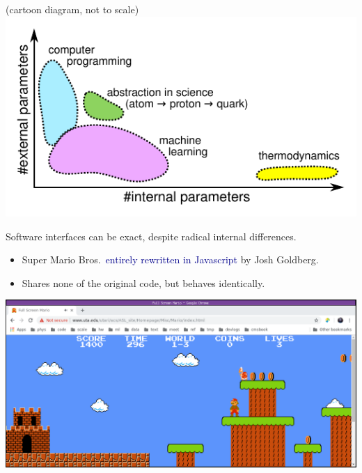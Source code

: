 \documentclass[aspectratio=169]{beamer}
\begin{document}
\begin{frame}{(cartoon diagram, not to scale)}
\vspace{0.2 cm}
\includegraphics[width=\linewidth]{internal-vs-external.pdf}
\end{frame}

\begin{frame}{Software interfaces can be exact, despite radical internal differences.}
\large
\vspace{0.13 cm}
\begin{itemize}
\item Super Mario Bros.\ \textcolor{darkblue}{entirely rewritten in Javascript} by Josh Goldberg.
\item Shares none of the original code, but behaves identically.
\end{itemize}

\begin{center}
\includegraphics[width=0.97\linewidth]{supermario-javascript.png}
\end{center}

\vspace{-1.8 cm}\mbox{ }\hfill{}\hfill\mbox{ }

\vspace{1.8 cm}
\end{frame}
\end{document}
